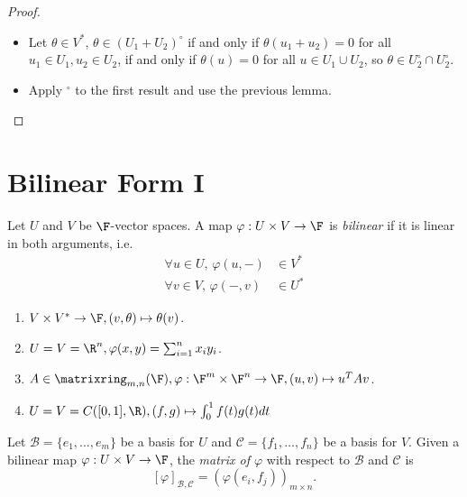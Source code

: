 \documentclass[a4paper]{article}
\newcommand*{\M}{\matrixring}
\newcommand*{\ann}{\circ}
\newcommand*{\basis}{\mathcal}
\theoremstyle{definition}
\begin{document}
\begin{proof}\leavevmode
  \begin{itemize}
  \item Let \(\theta \in V^*\), \(\theta \in (U_1+U_2)^\ann\) if and only if \(\theta(u_1+u_2) = 0\) for all \(u_1\in U_1, u_2 \in U_2\), if and only if \(\theta(u) = 0\) for all \(u \in U_1 \cup U_2\), so \(\theta\in U_2^\ann \cap U_2^\ann\).
  \item Apply \(^\ann\) to the first result and use the previous lemma.
  \end{itemize}
\end{proof}

\section{Bilinear Form I}

\begin{definition}
  Let \(U\) and \(V\) be \(\F\)-vector spaces. A map \(\varphi: U \times V \to \F\) is \emph{bilinear} if it is linear in both arguments, i.e.
  \begin{align*}
    \forall u \in U, \, \varphi(u, -) &\in V^* \\
    \forall v \in V, \, \varphi(-, v) &\in U^*
  \end{align*}
\end{definition}

\begin{eg}\leavevmode
  \begin{enumerate}
  \item \(V \times V^* \to \F, (v, \theta) \mapsto \theta(v)\).
  \item \(U = V = \R^n, \varphi(x, y) = \sum_{i=1}^{n}x_iy_i\).
  \item \(A \in \M_{m,n}(\F), \varphi: \F^m \times \F^n \to \F, (u, v) \mapsto u^TAv\).
  \item \(U = V = C([0, 1], \R), (f, g) \mapsto \int_{0}^{1} f(t)g(t) dt \)
  \end{enumerate}
\end{eg}

\begin{definition}
  Let \(\basis B = \{e_1,\dots,e_m\}\) be a basis for \(U\) and \(\basis C = \{f_1,\dots,f_n\}\) be a basis for \(V\). Given a bilinear map \(\varphi: U \times V \to \F\), the \emph{matrix of \(\varphi\)} with respect to \(\basis B\) and \(\basis C\) is
  \[
    [\varphi]_{\basis B, \basis C} = \left( \varphi(e_i, f_j) \right)_{m \times n}.
  \]
\end{definition}
\end{document}
